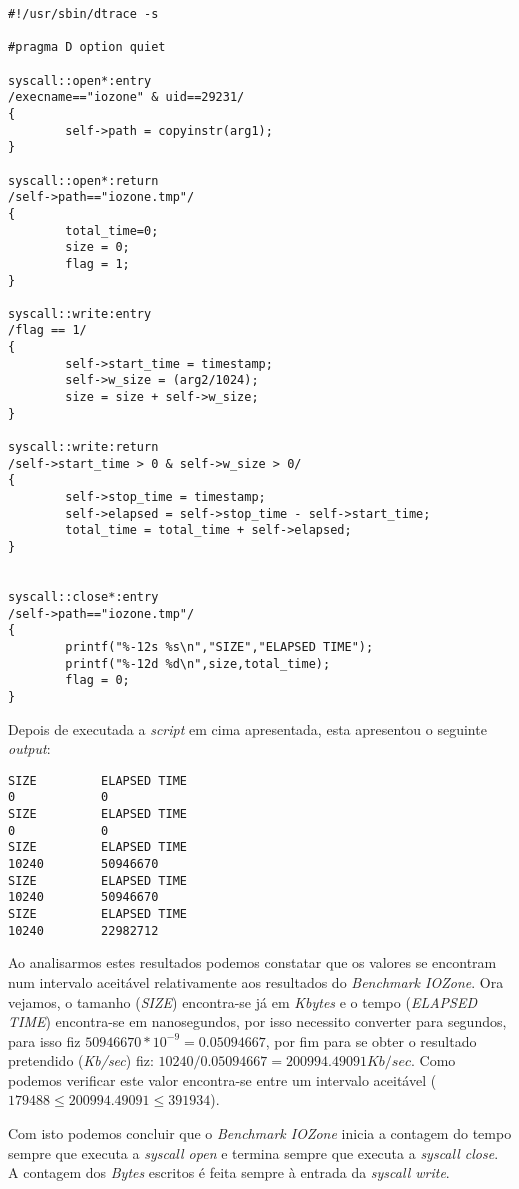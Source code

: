 \documentclass[conference,compsoc]{IEEEtran}
\begin{document}
\begin{lstlisting}
#!/usr/sbin/dtrace -s

#pragma D option quiet

syscall::open*:entry
/execname=="iozone" & uid==29231/
{
        self->path = copyinstr(arg1);
}

syscall::open*:return
/self->path=="iozone.tmp"/
{
        total_time=0;
        size = 0;
        flag = 1; 
}

syscall::write:entry
/flag == 1/
{
        self->start_time = timestamp;
        self->w_size = (arg2/1024);     
        size = size + self->w_size;
}

syscall::write:return
/self->start_time > 0 & self->w_size > 0/
{
        self->stop_time = timestamp;
        self->elapsed = self->stop_time - self->start_time;
        total_time = total_time + self->elapsed; 
}


syscall::close*:entry
/self->path=="iozone.tmp"/
{
        printf("%-12s %s\n","SIZE","ELAPSED TIME");
        printf("%-12d %d\n",size,total_time);
        flag = 0;
} 
\end{lstlisting}

Depois de executada a \textit{script} em cima apresentada, esta apresentou o seguinte \textit{output}:

\begin{lstlisting}
SIZE         ELAPSED TIME
0            0
SIZE         ELAPSED TIME
0            0
SIZE         ELAPSED TIME
10240        50946670
SIZE         ELAPSED TIME
10240        50946670
SIZE         ELAPSED TIME
10240        22982712
\end{lstlisting}

Ao analisarmos estes resultados podemos constatar que os valores se encontram num intervalo aceitável relativamente aos resultados do \textit{Benchmark IOZone}. Ora vejamos, o tamanho (\textit{SIZE}) encontra-se já em \textit{Kbytes} e o tempo (\textit{ELAPSED TIME}) encontra-se em nanosegundos, por isso necessito converter para segundos, para isso fiz $50946670*10^{-9} = 0.05094667$, por fim para se obter o resultado pretendido (\textit{Kb/sec}) fiz: $10240/0.05094667=200994.49091 Kb/sec$. Como podemos verificar este valor encontra-se entre um intervalo aceitável ($179488 	\le 200994.49091 \le 391934$).

Com isto podemos concluir que o \textit{Benchmark IOZone} inicia a contagem do tempo sempre que executa a \textit{syscall open} e termina sempre que executa a \textit{syscall close}. A contagem dos \textit{Bytes} escritos é feita sempre à entrada da \textit{syscall write}.
\end{document}

